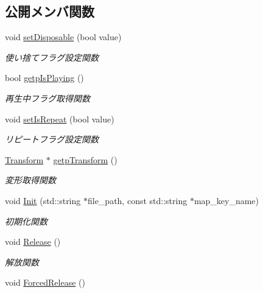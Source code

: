 \subsection*{公開メンバ関数}
\begin{DoxyCompactItemize}
\item 
void \mbox{\hyperlink{class_effekseer_object_ae109ced0206affab5d002a218d3c825c}{set\+Disposable}} (bool value)
\begin{DoxyCompactList}\small\item\em 使い捨てフラグ設定関数 \end{DoxyCompactList}\item 
bool \mbox{\hyperlink{class_effekseer_object_a2c09306dca9956b1f2518f10a10dd698}{getp\+Is\+Playing}} ()
\begin{DoxyCompactList}\small\item\em 再生中フラグ取得関数 \end{DoxyCompactList}\item 
void \mbox{\hyperlink{class_effekseer_object_a5a321097534dd21b16862f56f66e730b}{set\+Is\+Repeat}} (bool value)
\begin{DoxyCompactList}\small\item\em リピートフラグ設定関数 \end{DoxyCompactList}\item 
\mbox{\hyperlink{class_transform}{Transform}} $\ast$ \mbox{\hyperlink{class_effekseer_object_adb8963108c1ddd2ce6926f974b5f0acc}{getp\+Transform}} ()
\begin{DoxyCompactList}\small\item\em 変形取得関数 \end{DoxyCompactList}\item 
void \mbox{\hyperlink{class_effekseer_object_a1a868153244f3b30ed4ab63e3b9cee91}{Init}} (std\+::string $\ast$file\+\_\+path, const std\+::string $\ast$map\+\_\+key\+\_\+name)
\begin{DoxyCompactList}\small\item\em 初期化関数 \end{DoxyCompactList}\item 
void \mbox{\hyperlink{class_effekseer_object_a8d5a00238954a2368bbf870dfa8908f7}{Release}} ()
\begin{DoxyCompactList}\small\item\em 解放関数 \end{DoxyCompactList}\item 
void \mbox{\hyperlink{class_effekseer_object_a59e36b36fbd554807987b55495250dd2}{Forced\+Release}} ()

\end{DoxyCompactItemize}
